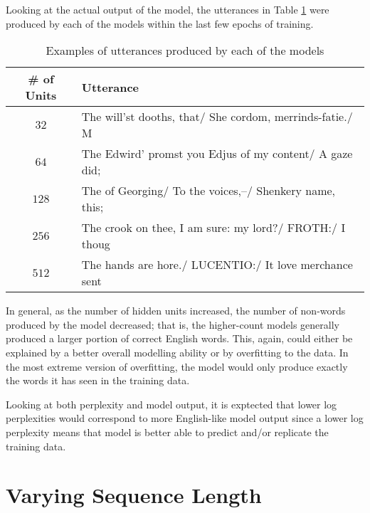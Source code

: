 \documentclass[a4paper]{article}
\begin{document}
Looking at the actual output of the model, the utterances in Table
\ref{tbl-hidden-utt} were produced by each of the models within the last
few epochs of training.

\begin{table}[h]
 \caption{Examples of utterances produced by each of the models}
 \label{tbl-hidden-utt}
 \begin{center}
  \begin{tabular}{cl}
    \hline \hline
    \# of Units & Utterance \\
    \hline
    $32$  & The will'st dooths, that/ She cordom, merrinds-fatie./ M \\
    $64$  & The Edwird' promst you Edjus of my content/ A gaze did; \\
    $128$ & The of Georging/ To the voices,--/ Shenkery name, this; \\
    $256$ & The crook on thee, I am sure: my lord?/ FROTH:/ I thoug \\
    $512$ & The hands are hore./ LUCENTIO:/ It love merchance sent  \\
    \hline \hline
  \end{tabular}
 \end{center}
\end{table}

In general, as the number of hidden units increased, the number of non-words
produced by the model decreased; that is, the higher-count models generally
produced a larger portion of correct English words. This, again, could either be
explained by a better overall modelling ability or by overfitting to the data.
In the most extreme version of overfitting, the model would only produce exactly
the words it has seen in the training data.

Looking at both perplexity and model output, it is exptected that lower log
perplexities would correspond to more English-like model output since a lower
log perplexity means that model is better able to predict and/or replicate
the training data.

\section{Varying Sequence Length}
\end{document}
